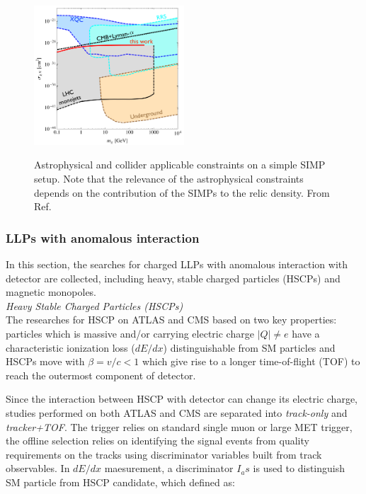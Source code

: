 \begin{figure}
    \centering
    \caption{Astrophysical and collider applicable constraints on a simple SIMP setup. Note that the relevance of the astrophysical constraints depends on the contribution of the SIMPs to the relic density. From Ref.\cite{SimpleSIMP}}
    \includegraphics[width=0.5\textwidth]{fig/SIMP.png}
    \label{fig:SIMP}
\end{figure}


\subsubsection{LLPs with anomalous interaction}

In this section, the searches for charged LLPs with anomalous interaction with detector are collected, including heavy, stable charged particles (HSCPs) and magnetic monopoles.\\

\textit{Heavy Stable Charged Particles (HSCPs)}\\

 The researches for HSCP on ATLAS and CMS based on two key properties: particles which is  massive and/or carrying electric charge $|Q| \neq e$ have a characteristic ionization loss ($dE/dx$) distinguishable from SM particles and HSCPs move with $\beta = v/c < 1$ which give rise to a longer time-of-flight (TOF) to reach the outermost component of detector. 

Since the interaction between HSCP with detector can change its electric charge, studies performed on both ATLAS and CMS are separated into \textit{track-only} and \textit{tracker+TOF}. The trigger relies on standard single muon or large MET trigger, the offline selection relies on identifying the signal events from quality requirements on the tracks using discriminator variables built from track observables. In $dE/dx$ maesurement,
 a discriminator $I_as$ is used to distinguish SM particle from HSCP candidate, which defined as:
 
